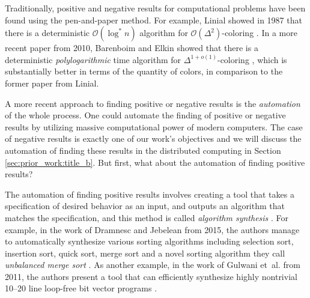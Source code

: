 Traditionally, positive and negative results for computational problems have been found using the pen-and-paper method.
For example, Linial showed in 1987 that there is a deterministic \(\mathcal{O}(\log^* n)\) algorithm for \(\mathcal{O}(\Delta^2)\)-coloring \cite{DBLP:conf/focs/Linial87}.
In a more recent paper from 2010, Barenboim and Elkin showed that there is a deterministic \emph{polylogarithmic} time algorithm for \(\Delta^{1 + o(1)}\)-coloring \cite{DBLP:conf/podc/BarenboimE10}, which is substantially better in terms of the quantity of colors, in comparison to the former paper \cite{DBLP:conf/focs/Linial87} from Linial.

A more recent approach to finding positive or negative results is the \emph{automation} of the whole process.
One could automate the finding of positive or negative results by utilizing massive computational power of modern computers.
The case of negative results is exactly one of our work's objectives and we will discuss the automation of finding these results in the distributed computing in Section \ref{sec:prior_work:title_b}.
But first, what about the automation of finding positive results?

The automation of finding positive results involves creating a tool that takes a specification of desired behavior as an input, and outputs an algorithm that matches the specification, and this method is called \emph{algorithm synthesis} \cite{DBLP:phd/basesearch/Rybicki16}.
For example, in the work of Dramnesc and Jebelean from 2015, the authors manage to automatically synthesize various sorting algorithms including selection sort, insertion sort, quick sort, merge sort and a novel sorting algorithm they call \emph{unbalanced merge sort} \cite{DBLP:journals/jsc/DramnescJ15}.
As another example, in the work of Gulwani et~al. from 2011, the authors present a tool that can efficiently synthesize highly nontrivial 10--20 line loop-free bit vector programs \cite{DBLP:conf/pldi/GulwaniJTV11}.

